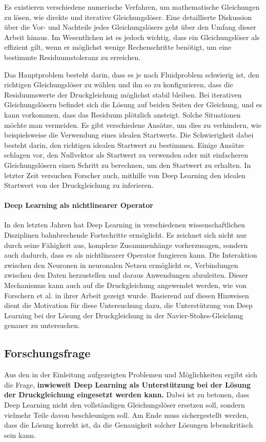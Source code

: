 Es existieren verschiedene numerische Verfahren, um mathematische Gleichungen zu lösen, wie direkte und iterative Gleichungslöser. Eine detaillierte Diskussion über die Vor- und Nachteile jedes Gleichungslösers geht über den Umfang dieser Arbeit hinaus. Im Wesentlichen ist es jedoch wichtig, dass ein Gleichungslöser als effizient gilt, wenn er möglichst wenige Rechenschritte benötigt, um eine bestimmte Residuumstoleranz zu erreichen.

Das Hauptproblem besteht darin, dass es je nach Fluidproblem schwierig ist, den richtigen Gleichungslöser zu wählen und ihn so zu konfigurieren, dass die Residuumswerte der Druckgleichung möglichst stabil bleiben. Bei iterativen Gleichungslösern befindet sich die Lösung auf beiden Seiten der Gleichung, und es kann vorkommen, dass das Residuum plötzlich ansteigt. Solche Situationen möchte man vermeiden. Es gibt verschiedene Ansätze, um dies zu verhindern, wie beispielsweise die Verwendung eines idealen Startwerts. Die Schwierigkeit dabei besteht darin, den richtigen idealen Startwert zu bestimmen. Einige Ansätze schlagen vor, den Nullvektor als Startwert zu verwenden oder mit einfacheren Gleichungslösern einen Schritt zu berechnen, um den Startwert zu erhalten. In letzter Zeit versuchen Forscher auch, mithilfe von Deep Learning den idealen Startwert von der Druckgleichung zu inferieren.

\paragraph{Deep Learning als nichtlinearer Operator}
In den letzten Jahren hat Deep Learning in verschiedenen wissenschaftlichen Disziplinen bahnbrechende Fortschritte ermöglicht. Es zeichnet sich nicht nur durch seine Fähigkeit aus, komplexe Zusammenhänge vorherzusagen, sondern auch dadurch, dass es als nichtlinearer Operator fungieren kann. Die Interaktion zwischen den Neuronen in neuronalen Netzen ermöglicht es, Verbindungen zwischen den Daten herzustellen und daraus Anwendungen abzuleiten. Dieser Mechanismus kann auch auf die Druckgleichung angewendet werden, wie von Forschern et al. in ihrer Arbeit gezeigt wurde. Basierend auf diesen Hinweisen dient die Motivation für diese Untersuchung dazu, die Unterstützung von Deep Learning bei der Lösung der Druckgleichung in der Navier-Stokes-Gleichung genauer zu untersuchen.

\subsection{Forschungsfrage}
Aus den in der Einleitung aufgezeigten Problemen und Möglichkeiten ergibt sich die Frage, \textbf{inwieweit Deep Learning als Unterstützung bei der Lösung der Druckgleichung eingesetzt werden kann.} Dabei ist zu betonen, dass Deep Learning nicht den vollständigen Gleichungslöser ersetzen soll, sondern vielmehr Teile davon beschleunigen soll. Am Ende muss sichergestellt werden, dass die Lösung korrekt ist, da die Genauigkeit solcher Lösungen lebenskritisch sein kann.

